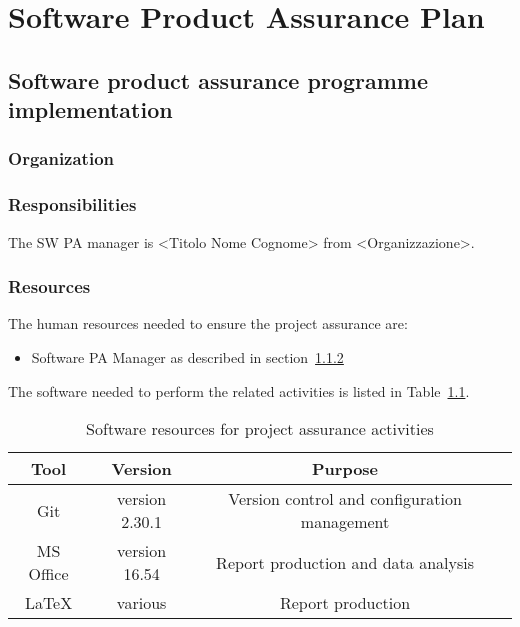 \chapter{Software Product Assurance Plan}

\section{Software product assurance programme implementation}

\subsection{Organization}
\label{subsec:organization}

\subsection{Responsibilities}
\label{subsec:resp}


The SW PA manager is <Titolo Nome Cognome> from <Organizzazione>.

\subsection{Resources}
The human resources needed to ensure the project assurance are:
\begin{itemize}
  \item Software PA Manager as described in section~\ref{subsec:resp}%
\end{itemize}

The software needed to perform the related activities is listed in Table~\ref{table:software_resources}.

\begin{table}[H]
\centering
\begin{tabular}{||c|c|c|c||}
 \hline
 \textbf{Tool} & \textbf{Version} & \textbf{Purpose}\\
 \hline
 Git & version 2.30.1 & Version control and configuration management \\
 MS Office & version 16.54 & Report production and data analysis \\
 LaTeX & various & Report production \\
 \hline
\end{tabular}
\caption{Software resources for project assurance activities}
\label{table:software_resources}
\end{table}

